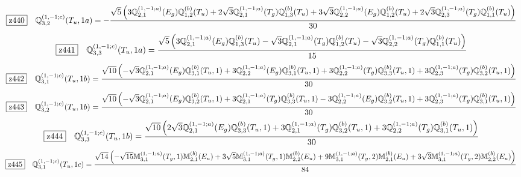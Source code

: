 \documentclass[fleqn,10pt,landscape]{jsarticle}
\begin{document}
\begin{dmath*}
\hspace*{3mm}\fbox{z440}\quad \mathbb{Q}_{3,2}^{(1,-1;c)}(T_{u},1a)=- \frac{\sqrt{5} \left(3 \mathbb{Q}_{2,1}^{(1,-1;a)}(E_{g}) \mathbb{Q}_{1,2}^{(b)}(T_{u}) + 2 \sqrt{3} \mathbb{Q}_{2,1}^{(1,-1;a)}(T_{g}) \mathbb{Q}_{1,3}^{(b)}(T_{u}) + 3 \sqrt{3} \mathbb{Q}_{2,2}^{(1,-1;a)}(E_{g}) \mathbb{Q}_{1,2}^{(b)}(T_{u}) + 2 \sqrt{3} \mathbb{Q}_{2,3}^{(1,-1;a)}(T_{g}) \mathbb{Q}_{1,1}^{(b)}(T_{u})\right)}{30}
\end{dmath*}
\begin{dmath*}
\hspace*{3mm}\fbox{z441}\quad \mathbb{Q}_{3,3}^{(1,-1;c)}(T_{u},1a)=\frac{\sqrt{5} \left(3 \mathbb{Q}_{2,1}^{(1,-1;a)}(E_{g}) \mathbb{Q}_{1,3}^{(b)}(T_{u}) - \sqrt{3} \mathbb{Q}_{2,1}^{(1,-1;a)}(T_{g}) \mathbb{Q}_{1,2}^{(b)}(T_{u}) - \sqrt{3} \mathbb{Q}_{2,2}^{(1,-1;a)}(T_{g}) \mathbb{Q}_{1,1}^{(b)}(T_{u})\right)}{15}
\end{dmath*}
\begin{dmath*}
\hspace*{3mm}\fbox{z442}\quad \mathbb{Q}_{3,1}^{(1,-1;c)}(T_{u},1b)=\frac{\sqrt{10} \left(- \sqrt{3} \mathbb{Q}_{2,1}^{(1,-1;a)}(E_{g}) \mathbb{Q}_{3,1}^{(b)}(T_{u},1) + 3 \mathbb{Q}_{2,2}^{(1,-1;a)}(E_{g}) \mathbb{Q}_{3,1}^{(b)}(T_{u},1) + 3 \mathbb{Q}_{2,2}^{(1,-1;a)}(T_{g}) \mathbb{Q}_{3,3}^{(b)}(T_{u},1) + 3 \mathbb{Q}_{2,3}^{(1,-1;a)}(T_{g}) \mathbb{Q}_{3,2}^{(b)}(T_{u},1)\right)}{30}
\end{dmath*}
\begin{dmath*}
\hspace*{3mm}\fbox{z443}\quad \mathbb{Q}_{3,2}^{(1,-1;c)}(T_{u},1b)=\frac{\sqrt{10} \left(- \sqrt{3} \mathbb{Q}_{2,1}^{(1,-1;a)}(E_{g}) \mathbb{Q}_{3,2}^{(b)}(T_{u},1) + 3 \mathbb{Q}_{2,1}^{(1,-1;a)}(T_{g}) \mathbb{Q}_{3,3}^{(b)}(T_{u},1) - 3 \mathbb{Q}_{2,2}^{(1,-1;a)}(E_{g}) \mathbb{Q}_{3,2}^{(b)}(T_{u},1) + 3 \mathbb{Q}_{2,3}^{(1,-1;a)}(T_{g}) \mathbb{Q}_{3,1}^{(b)}(T_{u},1)\right)}{30}
\end{dmath*}
\begin{dmath*}
\hspace*{3mm}\fbox{z444}\quad \mathbb{Q}_{3,3}^{(1,-1;c)}(T_{u},1b)=\frac{\sqrt{10} \left(2 \sqrt{3} \mathbb{Q}_{2,1}^{(1,-1;a)}(E_{g}) \mathbb{Q}_{3,3}^{(b)}(T_{u},1) + 3 \mathbb{Q}_{2,1}^{(1,-1;a)}(T_{g}) \mathbb{Q}_{3,2}^{(b)}(T_{u},1) + 3 \mathbb{Q}_{2,2}^{(1,-1;a)}(T_{g}) \mathbb{Q}_{3,1}^{(b)}(T_{u},1)\right)}{30}
\end{dmath*}
\begin{dmath*}
\hspace*{3mm}\fbox{z445}\quad \mathbb{Q}_{3,1}^{(1,-1;c)}(T_{u},1c)=\frac{\sqrt{14} \left(- \sqrt{15} \mathbb{M}_{3,1}^{(1,-1;a)}(T_{g},1) \mathbb{M}_{2,1}^{(b)}(E_{u}) + 3 \sqrt{5} \mathbb{M}_{3,1}^{(1,-1;a)}(T_{g},1) \mathbb{M}_{2,2}^{(b)}(E_{u}) + 9 \mathbb{M}_{3,1}^{(1,-1;a)}(T_{g},2) \mathbb{M}_{2,1}^{(b)}(E_{u}) + 3 \sqrt{3} \mathbb{M}_{3,1}^{(1,-1;a)}(T_{g},2) \mathbb{M}_{2,2}^{(b)}(E_{u})\right)}{84}
\end{dmath*}
\end{document}
